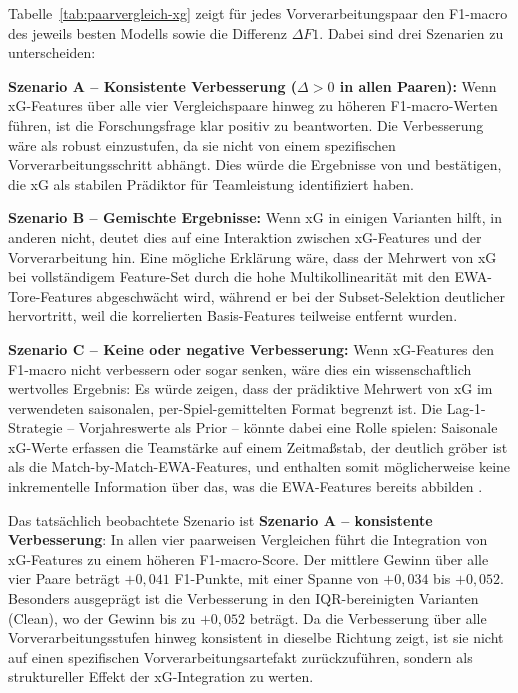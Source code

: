 Tabelle~\ref{tab:paarvergleich-xg} zeigt für jedes Vorverarbeitungspaar
den F1-macro des jeweils besten Modells sowie die Differenz $\Delta F1$.
Dabei sind drei Szenarien zu unterscheiden:

\textbf{Szenario A -- Konsistente Verbesserung ($\Delta > 0$ in allen Paaren):}
Wenn xG-Features über alle vier Vergleichspaare hinweg zu höheren F1-macro-Werten
führen, ist die Forschungsfrage klar positiv zu beantworten. Die
Verbesserung wäre als robust einzustufen, da sie nicht von einem
spezifischen Vorverarbeitungsschritt abhängt. Dies würde die Ergebnisse
von \textcite{AnzerBauer2021} und \textcite{VanEetveldeEtAl2024} bestätigen,
die xG als stabilen Prädiktor für Teamleistung identifiziert haben.

\textbf{Szenario B -- Gemischte Ergebnisse:}
Wenn xG in einigen Varianten hilft, in anderen nicht, deutet dies auf
eine Interaktion zwischen xG-Features und der Vorverarbeitung hin.
Eine mögliche Erklärung wäre, dass der Mehrwert von xG bei vollständigem
Feature-Set durch die hohe Multikollinearität mit den EWA-Tore-Features
abgeschwächt wird, während er bei der Subset-Selektion deutlicher
hervortritt, weil die korrelierten Basis-Features teilweise entfernt wurden.

\textbf{Szenario C -- Keine oder negative Verbesserung:}
Wenn xG-Features den F1-macro nicht verbessern oder sogar senken,
wäre dies ein wissenschaftlich wertvolles Ergebnis: Es würde zeigen,
dass der prädiktive Mehrwert von xG im verwendeten saisonalen,
per-Spiel-gemittelten Format begrenzt ist. Die Lag-1-Strategie
-- Vorjahreswerte als Prior -- könnte dabei eine Rolle spielen:
Saisonale xG-Werte erfassen die Teamstärke auf einem Zeitmaßstab,
der deutlich gröber ist als die Match-by-Match-EWA-Features, und
enthalten somit möglicherweise keine inkrementelle Information über
das, was die EWA-Features bereits abbilden \cite{KaufmanRossetPerlich2012}.

Das tatsächlich beobachtete Szenario ist \textbf{Szenario A -- konsistente
Verbesserung}: In allen vier paarweisen Vergleichen führt die Integration
von xG-Features zu einem höheren F1-macro-Score. Der mittlere Gewinn über alle
vier Paare beträgt $+0{,}041$ F1-Punkte, mit einer Spanne von $+0{,}034$ bis
$+0{,}052$. Besonders ausgeprägt ist die Verbesserung in den IQR-bereinigten
Varianten (Clean), wo der Gewinn bis zu $+0{,}052$ beträgt. Da die Verbesserung
über alle Vorverarbeitungsstufen hinweg konsistent in dieselbe Richtung zeigt,
ist sie nicht auf einen spezifischen Vorverarbeitungsartefakt zurückzuführen,
sondern als struktureller Effekt der xG-Integration zu werten.

